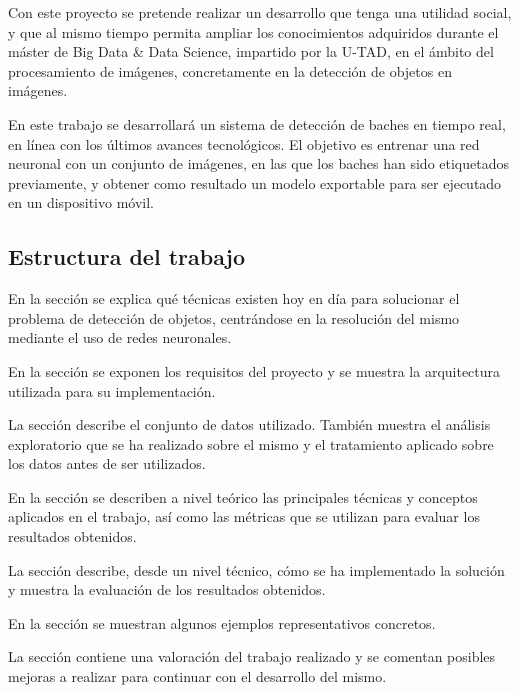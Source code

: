 Con este proyecto se pretende realizar un desarrollo que tenga una utilidad social, y que al mismo tiempo permita ampliar los conocimientos adquiridos durante el máster de Big Data \& Data Science, impartido por la U-TAD, en el ámbito del procesamiento de imágenes, concretamente en la detección de objetos en imágenes.

En este trabajo se desarrollará un sistema de detección de baches en tiempo real, en línea con los últimos avances tecnológicos. El objetivo es entrenar una red neuronal con un conjunto de imágenes, en las que los baches han sido etiquetados previamente, y obtener como resultado un modelo exportable para ser ejecutado en un dispositivo móvil.

\subsection{Estructura del trabajo}

En la sección \textit{} se explica qué técnicas existen hoy en día para solucionar el problema de detección de objetos, centrándose en la resolución del mismo mediante el uso de redes neuronales.

En la sección \textit{} se exponen los requisitos del proyecto y se muestra la arquitectura utilizada para su implementación.

La sección \textit{} describe el conjunto de datos utilizado. También muestra el análisis exploratorio que se ha realizado sobre el mismo y el tratamiento aplicado sobre los datos antes de ser utilizados.

En la sección \textit{} se describen a nivel teórico las principales técnicas y conceptos aplicados en el trabajo, así como las métricas que se utilizan para evaluar los resultados obtenidos.

La sección \textit{} describe, desde un nivel técnico, cómo se ha implementado la solución y muestra la evaluación de los resultados obtenidos.

En la sección \textit{} se muestran algunos ejemplos representativos concretos.

La sección \textit{} contiene una valoración del trabajo realizado y se comentan posibles mejoras a realizar para continuar con el desarrollo del mismo.
